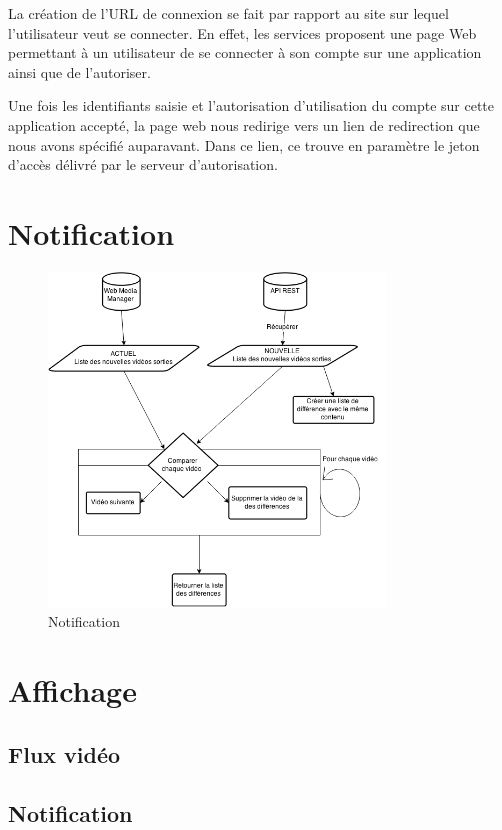 \documentclass[11pt]{report} %
\begin{document}
	
	La création de l'URL de connexion se fait par rapport au site sur lequel l'utilisateur veut se connecter. En effet, les services proposent une page Web permettant à un utilisateur de se connecter à son compte sur une application ainsi que de l'autoriser.
	
	Une fois les identifiants saisie et l'autorisation d'utilisation du compte sur cette application accepté, la page web nous redirige vers un lien de redirection que nous avons spécifié auparavant. Dans ce lien, ce trouve en paramètre le jeton d'accès délivré par le serveur d'autorisation.

	
	\section{Notification}
	
	\begin{figure}[h]
		\center
		\includegraphics[width=0.8\textwidth]{../img/notification.png}
		\caption{Notification}
		\label{checkNotif}
	\end{figure}
	
	\section{Affichage}
		\subsection{Flux vidéo}
		
		\subsection{Notification}
		
\end{document}
